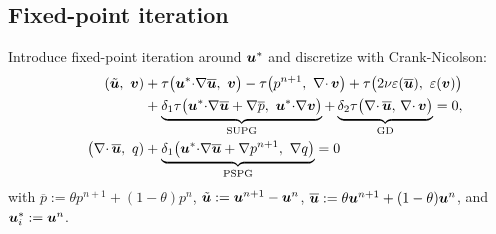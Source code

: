 \documentclass[onefignum,onetabnum]{siamart190516}
\begin{document}
\subsection{Fixed-point iteration}

Introduce fixed-point iteration around ${\boldsymbol u}^*$ and
discretize with Crank-Nicolson:
\begin{equation}
  \begin{aligned}
    \left( \tilde{{\boldsymbol u}} ,\  {\boldsymbol v} \right) 
    &+ \tau \big( {\boldsymbol u}^* {\cdot} \nabla \overline{{\boldsymbol u}},\ {\boldsymbol v} \big)
    - \tau \big( p^{n+1},\ \nabla{\cdot\,} {\boldsymbol v} \big) + 
    \tau \big( 2 \nu \varepsilon(\overline{{\boldsymbol u}}),\ \varepsilon({\boldsymbol v}) \big) \\
    & 
    +  
    \underbrace{\delta_1 \tau \big( {\boldsymbol u}^* {\cdot} \nabla \overline{{\boldsymbol u}} + \nabla \overline{p}, \
    {\boldsymbol u}^* {\cdot} \nabla {\boldsymbol v}\big)}_{\text{SUPG}}  +
    \underbrace{\delta_2 \tau \big(\nabla{\cdot\,} \overline{{\boldsymbol u}}, \, \nabla{\cdot\,} {\boldsymbol v} \big)}_{\text{GD}}
    =0, \\
    \hspace{2.2em} 
    \big( \nabla{\cdot\,} \overline{{\boldsymbol u}},\ q)&
    + \underbrace{\delta_1 \big( {\boldsymbol u}^* {\cdot} \nabla \overline{{\boldsymbol u}} + \nabla p^{n+1} ,\ \nabla q \big)}_{\text{PSPG}} = 0 
  \end{aligned}
\end{equation}
with
$\overline{p} := \theta p^{n+1} + (1-\theta) p^{n}$,
$\tilde{{\boldsymbol u}} := {\boldsymbol u}^{n+1} - {\boldsymbol u}^{n}$,
$\overline{{\boldsymbol u}} := \theta {\boldsymbol u}^{n+1} + (1-\theta) {\boldsymbol u}^{n}$, 
and ${\boldsymbol u}^*_i:={\boldsymbol u}^n$.

%
%



%
% 
%
%
\end{document}
